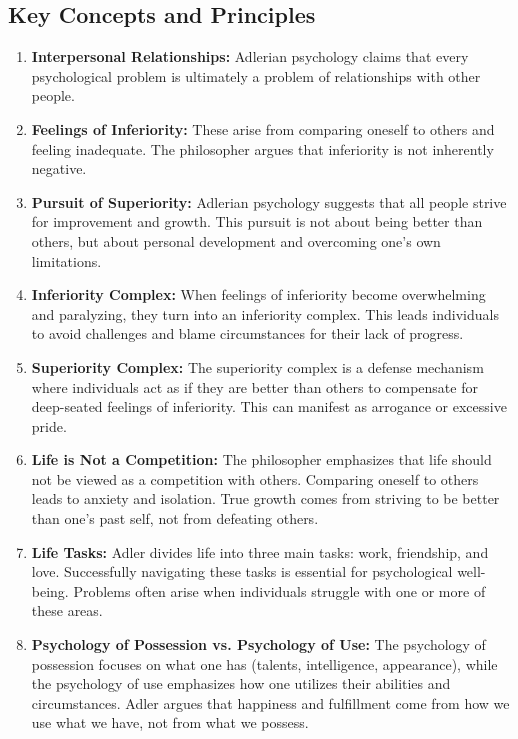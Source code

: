 \subsection*{Key Concepts and Principles}
\begin{enumerate}
    \item \textbf{Interpersonal Relationships:} Adlerian psychology claims that every psychological problem is ultimately a problem of relationships with other people.
    \item \textbf{Feelings of Inferiority:} These arise from comparing oneself to others and feeling inadequate. The philosopher argues that inferiority is not inherently negative.
    \item \textbf{Pursuit of Superiority:} Adlerian psychology suggests that all people strive for improvement and growth. This pursuit is not about being better than others, but about personal development and overcoming one's own limitations.
    \item \textbf{Inferiority Complex:} When feelings of inferiority become overwhelming and paralyzing, they turn into an inferiority complex. This leads individuals to avoid challenges and blame circumstances for their lack of progress.
    \item \textbf{Superiority Complex:} The superiority complex is a defense mechanism where individuals act as if they are better than others to compensate for deep-seated feelings of inferiority. This can manifest as arrogance or excessive pride.
    \item \textbf{Life is Not a Competition:} The philosopher emphasizes that life should not be viewed as a competition with others. Comparing oneself to others leads to anxiety and isolation. True growth comes from striving to be better than one's past self, not from defeating others.
    \item \textbf{Life Tasks:} Adler divides life into three main tasks: work, friendship, and love. Successfully navigating these tasks is essential for psychological well-being. Problems often arise when individuals struggle with one or more of these areas.
    \item \textbf{Psychology of Possession vs. Psychology of Use:} The psychology of possession focuses on what one has (talents, intelligence, appearance), while the psychology of use emphasizes how one utilizes their abilities and circumstances. Adler argues that happiness and fulfillment come from how we use what we have, not from what we possess.
\end{enumerate}

